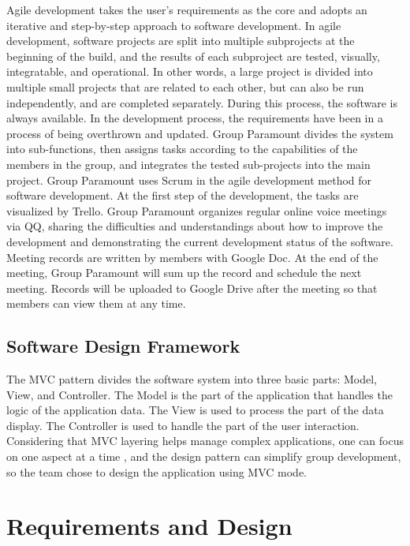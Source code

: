 \documentclass[11pt]{article}
\begin{document}
Agile development takes the user’s requirements as the core and adopts an iterative and step-by-step approach to software development. In agile development, software projects are split into multiple subprojects at the beginning of the build, and the results of each subproject are tested, visually, integratable, and operational. In other words, a large project is divided into multiple small projects that are related to each other, but can also be run independently, and are completed separately. During this process, the software is always available. In the development process, the requirements have been in a process of being overthrown and updated. Group Paramount divides the system into sub-functions, then assigns tasks according to the capabilities of the members in the group, and integrates the tested sub-projects into the main project.
Group Paramount uses Scrum in the agile development method for software development. At the ﬁrst step of the development, the tasks are visualized by Trello. Group Paramount organizes regular online voice meetings via QQ, sharing the diﬃculties and understandings about how to improve the development and demonstrating the current development status of the software. Meeting records are written by members with Google Doc. At the end of the meeting, Group Paramount will sum up the record and schedule the next meeting. Records will be uploaded to Google Drive after the meeting so that members can view them at any time.

\subsection{Software Design Framework}
The MVC pattern divides the software system into three basic parts: Model, View, and Controller. The Model is the part of the application that handles the logic of the application data. The View is used to process the part of the data display. The Controller is used to handle the part of the user interaction. Considering that MVC layering helps manage complex applications, one can focus on one aspect at a time , and the design pattern can simplify group development, so the team chose to design the application using MVC mode.


\clearpage
\section{Requirements and Design}
\end{document}
